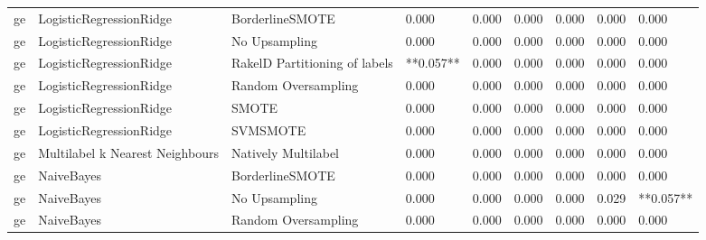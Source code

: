 \begin{tabular}{lllllllll}
      ge &         LogisticRegressionRidge &               BorderlineSMOTE &     0.000 &                     0.000 &                 0.000 &                  0.000 &                                   0.000 &     0.000 \\
      ge &         LogisticRegressionRidge &                 No Upsampling &     0.000 &                     0.000 &                 0.000 &                  0.000 &                                   0.000 &     0.000 \\
      ge &         LogisticRegressionRidge & RakelD Partitioning of labels & **0.057** &                     0.000 &                 0.000 &                  0.000 &                                   0.000 &     0.000 \\
      ge &         LogisticRegressionRidge &           Random Oversampling &     0.000 &                     0.000 &                 0.000 &                  0.000 &                                   0.000 &     0.000 \\
      ge &         LogisticRegressionRidge &                         SMOTE &     0.000 &                     0.000 &                 0.000 &                  0.000 &                                   0.000 &     0.000 \\
      ge &         LogisticRegressionRidge &                      SVMSMOTE &     0.000 &                     0.000 &                 0.000 &                  0.000 &                                   0.000 &     0.000 \\
      ge & Multilabel k Nearest Neighbours &           Natively Multilabel &     0.000 &                     0.000 &                 0.000 &                  0.000 &                                   0.000 &     0.000 \\
      ge &                      NaiveBayes &               BorderlineSMOTE &     0.000 &                     0.000 &                 0.000 &                  0.000 &                                   0.000 &     0.000 \\
      ge &                      NaiveBayes &                 No Upsampling &     0.000 &                     0.000 &                 0.000 &                  0.000 &                                   0.029 & **0.057** \\
      ge &                      NaiveBayes &           Random Oversampling &     0.000 &                     0.000 &                 0.000 &                  0.000 &                                   0.000 &     0.000 \\

\end{tabular}
